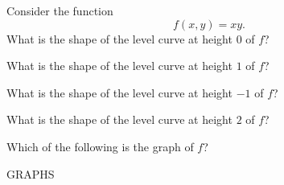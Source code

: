 \documentclass{ximera}
\begin{document}
\begin{problem}
Consider the function
\[
f(x,y) = xy.
\]
What is the shape of the level curve at height $0$ of $f$?
\begin{multipleChoice}
\end{multipleChoice}

What is the shape of the level curve at height $1$ of $f$?
\begin{multipleChoice}
\end{multipleChoice}

What is the shape of the level curve at height $-1$ of $f$?
\begin{multipleChoice}
\end{multipleChoice}

What is the shape of the level curve at height $2$ of $f$?
\begin{multipleChoice}
\end{multipleChoice}

Which of the following is the graph of $f$?

GRAPHS
\end{problem}
\end{document}
